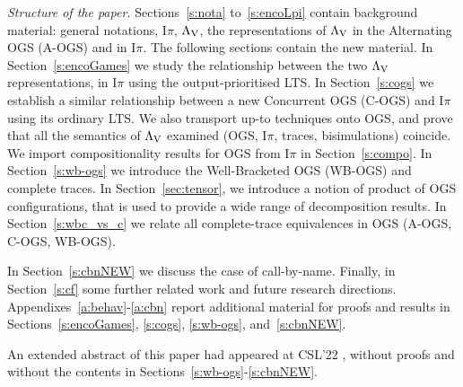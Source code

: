 \documentclass[11pt,a4paper]{amsart}
\theoremstyle{plain}
\theoremstyle{definition}
\theoremstyle{defC}
\theoremstyle{thmC}
\theoremstyle{plain}
\numberwithin{equation}{section}
\newcommand{\AOGS}{\mbox{{\rm A-OGS}}\xspace}      %
\newcommand{\COGS}{\mbox{{\rm C-OGS}}\xspace}      %
\newcommand{\WBOGS}{\mbox{{\rm WB-OGS}}\xspace}      %
\newcommand{\opLTS}{opLTS\xspace}  %
\newcommand{\LasV}{\Lambda_{\rm V}} %
\newcommand{\Intp}{\mbox{I$\pi$}\xspace}   %
\newcommand{\piI}{\Intp}   %
\theoremstyle{plain}
\theoremstyle{definition}
\newcommand{\cutLMCSsecondRound}[1]{}
\begin{document}
\emph{Structure of the paper.} 
Sections~\ref{s:nota} to~\ref{s:encoLpi} contain background material:
general  notations,
 \piI, $\LasV$,
the representations of $\LasV$  in the   Alternating OGS (\AOGS)
and  in \piI.
The following sections contain the new material.
In Section~\ref{s:encoGames} 
we study  the relationship  between the two $\LasV$ representations, 
 in   \piI using the output-prioritised LTS. 
In  Section~\ref{s:cogs}
we establish a similar relationship between 
 a  new  Concurrent OGS (\COGS) and  \piI using its ordinary LTS. We also transport 
up-to techniques onto OGS, and prove that all the semantics of $\LasV$ examined 
(OGS, \piI, traces, bisimulations)
 coincide. 
We import compositionality results for OGS from \piI in Section~\ref{s:compo}.
In Section~\ref{s:wb-ogs} we introduce the Well-Bracketed OGS (\WBOGS) and complete
traces. 
In Section~\ref{sec:tensor},
we introduce a notion of product of OGS configurations, that is used to
provide a wide range of decomposition results.
In  Section~\ref{s:wbc_vs_c} 
we relate all complete-trace equivalences in OGS (\AOGS, \COGS, \WBOGS). 
\cutLMCSsecondRound{In Section~\ref{s:fapiI}  we import   complete-trace equivalence and the full
abstraction result (for pure $\lambda$-terms)  into \piI.}
In Section~\ref{s:cbnNEW} we discuss the case of call-by-name.
Finally, in Section~\ref{s:cf} some further related work and future research directions. 
Appendixes~\ref{a:behav}-\ref{a:cbn} report additional  material for proofs and results in
Sections~\ref{s:encoGames}, \ref{s:cogs}, \ref{s:wb-ogs}, and~\ref{s:cbnNEW}. 

An extended abstract of this paper had appeared at CSL'22
\cite{JaberS22}, without proofs and without the contents in
Sections~\ref{s:wb-ogs}-\ref{s:cbnNEW}. 



\end{document}
